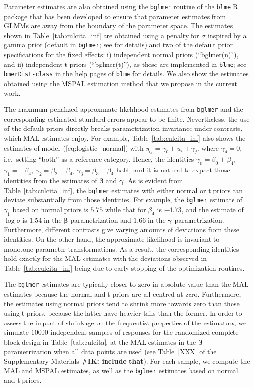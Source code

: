 \documentclass[11pt, a4paper]{article}
\newcommand*{\bb}{\boldsymbol}
\newcommand{\IK}[1]{{\noindent \color{blue} \bf \#IK: #1}}
\theoremstyle{example} \newtheorem{example}{Example}[section]
\theoremstyle{theorem} \newtheorem{theorem}{Theorem}[section]
\def\bbeta{\bb{\beta}}
\def\bgamma{\bb{\gamma}}
\def\bgamma{\bb{\gamma}}
\begin{document}
Parameter estimates are also obtained using the \texttt{bglmer}
routine of the \texttt{blme} R package \citep{chung+etal:2013} that has
been developed to ensure that parameter estimates from GLMMs are away
from the boundary of the parameter space. The estimates shown in
Table~\ref{tab:culcita_inf} are obtained using a penalty for $\sigma$
inspired by a gamma prior (default in \texttt{bglmer}; see
\citealt{chung+etal:2013} for details) and two of the default prior
specifications for the fixed effects: i) independent normal priors
(``bglmer(n)''), and ii) independent t priors (``bglmer(t)''), as
these are implemented in \texttt{blme}; see \texttt{bmerDist-class} in
the help pages of \texttt{blme} for details. We also show the
estimates obtained using the MSPAL estimation method that we propose
in the current work.

The maximum penalized approximate likelihood estimates from
\texttt{bglmer} and the corresponding estimated standard errors appear to
be finite. Nevertheless, the use of the default priors directly breaks
parametrization invariance under contrasts, which MAL estimates
enjoy. For example, Table~\ref{tab:culcita_inf} also shows the
estimates of model~(\ref{eq:logistic_normal}) with
$\eta_{ij} = \gamma_0 + u_i + \gamma_{j}$, where $\gamma_{4} = 0$,
i.e.~setting ``both'' as a reference category. Hence, the identities
$\gamma_0 = \beta_0 + \beta_4$, $\gamma_1 = -\beta_4$,
$\gamma_2 = \beta_2 - \beta_4$, $\gamma_3 = \beta_3 - \beta_4$ hold,
and it is natural to expect those identities from the estimates of
$\bbeta$ and $\bgamma$. As is evident from
Table~\ref{tab:culcita_inf}, the \texttt{bglmer} estimates with either
normal or t priors can deviate substantially from those
identities. For example, the \texttt{bglmer} estimate of $\gamma_1$
based on normal priors is $5.75$ while that for $\beta_4$ is $-4.73$,
and the estimate of $\log\sigma$ is $1.54$ in the $\bbeta$
parametrization and $1.66$ in the $\bgamma$
parametrization. Furthermore, different contrasts give varying
amounts of deviations from these identities. On the other hand, the
approximate likelihood is invariant to monotone parameter
transformations. As a result, the corresponding identities hold
exactly for the MAL estimates with the deviations observed in
Table~\ref{tab:culcita_inf} being due to early stopping of the optimization routines.

The \texttt{bglmer} estimates are typically closer to zero in absolute
value than the MAL estimates because the normal and t priors are all
centred at zero. Furthermore, the estimates using normal priors tend
to shrink more towards zero than those using t priors, because the
latter have heavier tails than the former. In order to assess the
impact of shrinkage on the frequentist properties of the estimators,
we simulate $10000$ independent samples of responses for the randomized
complete block design in Table~\ref{tab:culcita}, at the MAL estimates
in the $\bbeta$ parametrization when all data points are used (see
Table~\ref{XXX} of the Supplementary Materials  \IK{include that}). For each sample, we
compute the MAL and MSPAL estimates, as well as the \texttt{bglmer} estimates based on
normal and t priors.
\end{document}
